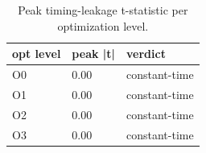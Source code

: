 \begin{table}[t]
  \centering
  \caption{Peak timing-leakage t-statistic per optimization level.}
  \label{tab:optsweep}
  \begin{tabular}{lll}
    \toprule
    opt level & peak |t| & verdict \\
    \midrule
    O0 & 0.00 & constant-time \\
    O1 & 0.00 & constant-time \\
    O2 & 0.00 & constant-time \\
    O3 & 0.00 & constant-time \\
    \bottomrule
  \end{tabular}
\end{table}
